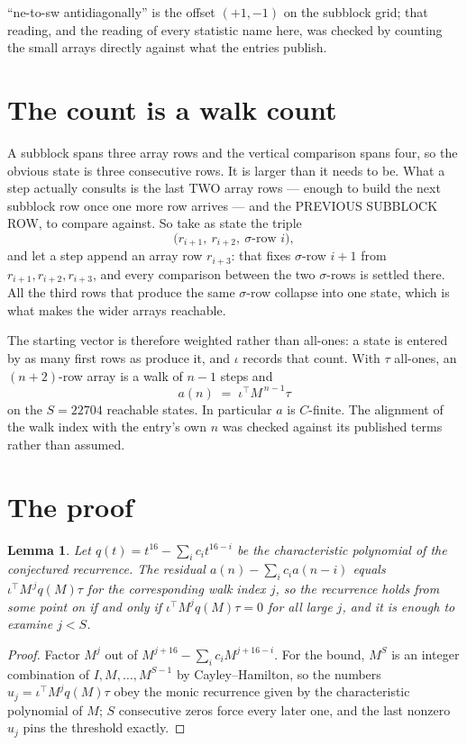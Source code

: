 \documentclass[11pt,a4paper]{article}
\theoremstyle{plain}
\newtheorem{lemma}[theorem]{Lemma}
\theoremstyle{definition}
\begin{document}
``ne-to-sw antidiagonally'' is the offset $(+1,-1)$ on the subblock grid; that reading, and
the reading of every statistic name here, was checked by counting the small arrays directly
against what the entries publish.

\section{The count is a walk count}

A subblock spans three array rows and the vertical comparison spans four, so the obvious state
is three consecutive rows. It is larger than it needs to be. What a step actually consults is
the last TWO array rows --- enough to build the next subblock row once one more row arrives ---
and the PREVIOUS SUBBLOCK ROW, to compare against. So take as state the triple
\[
\bigl(r_{i+1},\ r_{i+2},\ \sigma\text{-row }i\bigr),
\]
and let a step append an array row $r_{i+3}$: that fixes $\sigma$-row $i+1$ from
$r_{i+1},r_{i+2},r_{i+3}$, and every comparison between the two $\sigma$-rows is settled
there. All the third rows that produce the same $\sigma$-row collapse into one state, which is
what makes the wider arrays reachable.

The starting vector is therefore weighted rather than all-ones: a state is entered by as many
first rows as produce it, and $\iota$ records that count. With $\tau$ all-ones, an
$(n+2)$-row array is a walk of $n-1$ steps and
\[
a(n)\;=\;\iota^{\!\top}M^{\,n-1}\tau
\]
on the $S=22704$ reachable states. In particular $a$ is $C$-finite. The alignment of the walk
index with the entry's own $n$ was checked against its published terms rather than assumed.

\section{The proof}

\begin{lemma}\label{lem:crit}
Let $q(t)=t^{16}-\sum_i c_it^{16-i}$ be the characteristic polynomial of the
conjectured recurrence. The residual $a(n)-\sum_ic_ia(n-i)$ equals
$\iota^{\!\top}M^{\,j}q(M)\tau$ for the corresponding walk index $j$, so the recurrence
holds from some point on if and only if $\iota^{\!\top}M^{j}q(M)\tau=0$ for all large $j$,
and it is enough to examine $j<S$.
\end{lemma}

\begin{proof}
Factor $M^{j}$ out of $M^{j+16}-\sum_ic_iM^{j+16-i}$. For the bound, $M^{S}$
is an integer combination of $I,M,\dots,M^{S-1}$ by Cayley--Hamilton, so the numbers
$u_j=\iota^{\!\top}M^{j}q(M)\tau$ obey the monic recurrence given by the characteristic
polynomial of $M$; $S$ consecutive zeros force every later one, and the last nonzero $u_j$
pins the threshold exactly.
\end{proof}
\end{document}
